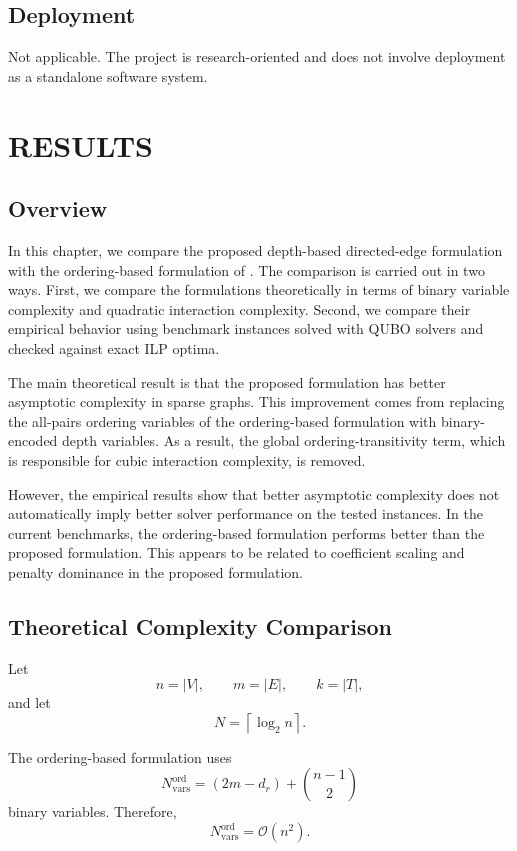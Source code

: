 \documentclass[a4paper,12pt]{report}
\begin{document}
\section{Deployment}

Not applicable. The project is research-oriented and does not involve deployment as a standalone software system.

\chapter{RESULTS}

\section{Overview}

In this chapter, we compare the proposed depth-based directed-edge formulation with the ordering-based formulation of \cite{alex_2017}. The comparison is carried out in two ways. First, we compare the formulations theoretically in terms of binary variable complexity and quadratic interaction complexity. Second, we compare their empirical behavior using benchmark instances solved with QUBO solvers and checked against exact ILP optima.

The main theoretical result is that the proposed formulation has better asymptotic complexity in sparse graphs. This improvement comes from replacing the all-pairs ordering variables of the ordering-based formulation with binary-encoded depth variables. As a result, the global ordering-transitivity term, which is responsible for cubic interaction complexity, is removed.

However, the empirical results show that better asymptotic complexity does not automatically imply better solver performance on the tested instances. In the current benchmarks, the ordering-based formulation performs better than the proposed formulation. This appears to be related to coefficient scaling and penalty dominance in the proposed formulation.

\section{Theoretical Complexity Comparison}

Let
\[
n=|V|,\qquad m=|E|,\qquad k=|T|,
\]
and let
\[
N=\left\lceil \log_2 n \right\rceil.
\]

The ordering-based formulation uses
\[
N_{\text{vars}}^{\text{ord}}
=
(2m-d_r)+\binom{n-1}{2}
\]
binary variables. Therefore,
\[
N_{\text{vars}}^{\text{ord}}
=
\mathcal{O}(n^2).
\]
\end{document}

